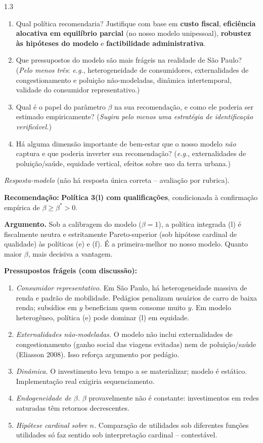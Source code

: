 \documentclass[11pt,addpoints]{exam}
\begin{document}
\begin{spacing}{1.3}
\begin{questions}
\begin{enumerate}[noitemsep]
\item Qual política recomendaria? Justifique com base em \textbf{custo fiscal}, \textbf{eficiência alocativa em equilíbrio parcial} (no nosso modelo unipessoal), \textbf{robustez às hipóteses do modelo} e \textbf{factibilidade administrativa}.
\item Que pressupostos do modelo são mais frágeis na realidade de São Paulo? (\textit{Pelo menos três}: \textit{e.g.}, heterogeneidade de consumidores, externalidades de congestionamento e poluição não-modeladas, dinâmica intertemporal, validade do consumidor representativo.)
\item Qual é o papel do parâmetro $\beta$ na sua recomendação, e como ele poderia ser estimado empiricamente? (\textit{Sugira pelo menos uma estratégia de identificação verificável.})
\item Há alguma dimensão importante de bem-estar que o nosso modelo \textit{não} captura e que poderia inverter sua recomendação? (\textit{e.g.}, externalidades de poluição/saúde, equidade vertical, efeitos sobre uso da terra urbana.)
\end{enumerate}

\begin{solution}
\textit{Resposta-modelo} (não há resposta única correta -- avaliação por rubrica).

\textbf{Recomendação:} \textbf{Política 3(l) com qualificações}, condicionada à confirmação empírica de $\beta \geq \beta^* > 0$.

\textbf{Argumento.} Sob a calibragem do modelo ($\beta = 1$), a política integrada (l) é fiscalmente neutra e estritamente Pareto-superior (sob hipótese cardinal de qualidade) às políticas (e) e (f). É a primeira-melhor no nosso modelo. Quanto maior $\beta$, mais decisiva a vantagem.

\textbf{Pressupostos frágeis (com discussão):}
\begin{enumerate}[noitemsep]
\item \textit{Consumidor representativo.} Em São Paulo, há heterogeneidade massiva de renda e padrão de mobilidade. Pedágios penalizam usuários de carro de baixa renda; subsídios em $y$ beneficiam quem consome muito $y$. Em modelo heterogêneo, política (e) pode dominar (l) em equidade.
\item \textit{Externalidades não-modeladas.} O modelo não inclui externalidades de congestionamento (ganho social das viagens evitadas) nem de poluição/saúde (Eliasson 2008). Isso reforça argumento por pedágio.
\item \textit{Dinâmica.} O investimento leva tempo a se materializar; modelo é estático. Implementação real exigiria sequenciamento.
\item \textit{Endogeneidade de $\beta$.} $\beta$ provavelmente não é constante: investimentos em redes saturadas têm retornos decrescentes.
\item \textit{Hipótese cardinal sobre $n$.} Comparação de utilidades sob diferentes funções utilidades só faz sentido sob interpretação cardinal -- contestável.
\end{enumerate}


\end{solution}
\end{questions}
\end{spacing}
\end{document}
